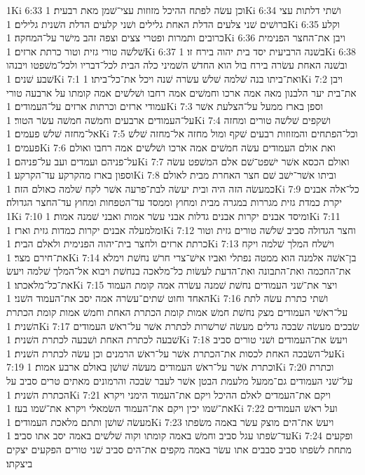 1Ki 6:33  וכן עשׂה לפתח ההיכל מזוזות עצי־שׁמן מאת רבעית׃
1Ki 6:34  ושׁתי דלתות עצי ברושׁים שׁני צלעים הדלת האחת גלילים ושׁני קלעים הדלת השׁנית גלילים׃
1Ki 6:35  וקלע כרובים ותמרות ופטרי צצים וצפה זהב מישׁר על־המחקה׃
1Ki 6:36  ויבן את־החצר הפנימית שׁלשׁה טורי גזית וטור כרתת ארזים׃
1Ki 6:37  בשׁנה הרביעית יסד בית יהוה בירח זו׃
1Ki 6:38  ובשׁנה האחת עשׂרה בירח בול הוא החדשׁ השׁמיני כלה הבית לכל־דבריו ולכל־משׁפטו ויבנהו שׁבע שׁנים׃
1Ki 7:1  ואת־ביתו בנה שׁלמה שׁלשׁ עשׂרה שׁנה ויכל את־כל־ביתו׃
1Ki 7:2  ויבן את־בית יער הלבנון מאה אמה ארכו וחמשׁים אמה רחבו ושׁלשׁים אמה קומתו על ארבעה טורי עמודי ארזים וכרתות ארזים על־העמודים׃
1Ki 7:3  וספן בארז ממעל על־הצלעת אשׁר על־העמודים ארבעים וחמשׁה חמשׁה עשׂר הטור׃
1Ki 7:4  ושׁקפים שׁלשׁה טורים ומחזה אל־מחזה שׁלשׁ פעמים׃
1Ki 7:5  וכל־הפתחים והמזוזות רבעים שׁקף ומול מחזה אל־מחזה שׁלשׁ פעמים׃
1Ki 7:6  ואת אולם העמודים עשׂה חמשׁים אמה ארכו ושׁלשׁים אמה רחבו ואולם על־פניהם ועמדים ועב על־פניהם׃
1Ki 7:7  ואולם הכסא אשׁר ישׁפט־שׁם אלם המשׁפט עשׂה וספון בארז מהקרקע עד־הקרקע׃
1Ki 7:8  וביתו אשׁר־ישׁב שׁם חצר האחרת מבית לאולם כמעשׂה הזה היה ובית יעשׂה לבת־פרעה אשׁר לקח שׁלמה כאולם הזה׃
1Ki 7:9  כל־אלה אבנים יקרת כמדת גזית מגררות במגרה מבית ומחוץ וממסד עד־הטפחות ומחוץ עד־החצר הגדולה׃
1Ki 7:10  ומיסד אבנים יקרות אבנים גדלות אבני עשׂר אמות ואבני שׁמנה אמות׃
1Ki 7:11  ומלמעלה אבנים יקרות כמדות גזית וארז׃
1Ki 7:12  וחצר הגדולה סביב שׁלשׁה טורים גזית וטור כרתת ארזים ולחצר בית־יהוה הפנימית ולאלם הבית׃
1Ki 7:13  וישׁלח המלך שׁלמה ויקח את־חירם מצר׃
1Ki 7:14  בן־אשׁה אלמנה הוא ממטה נפתלי ואביו אישׁ־צרי חרשׁ נחשׁת וימלא את־החכמה ואת־התבונה ואת־הדעת לעשׂות כל־מלאכה בנחשׁת ויבוא אל־המלך שׁלמה ויעשׂ את־כל־מלאכתו׃
1Ki 7:15  ויצר את־שׁני העמודים נחשׁת שׁמנה עשׂרה אמה קומת העמוד האחד וחוט שׁתים־עשׂרה אמה יסב את־העמוד השׁני׃
1Ki 7:16  ושׁתי כתרת עשׂה לתת על־ראשׁי העמודים מצק נחשׁת חמשׁ אמות קומת הכתרת האחת וחמשׁ אמות קומת הכתרת השׁנית׃
1Ki 7:17  שׂבכים מעשׂה שׂבכה גדלים מעשׂה שׁרשׁרות לכתרת אשׁר על־ראשׁ העמודים שׁבעה לכתרת האחת ושׁבעה לכתרת השׁנית׃
1Ki 7:18  ויעשׂ את־העמודים ושׁני טורים סביב על־השׂבכה האחת לכסות את־הכתרת אשׁר על־ראשׁ הרמנים וכן עשׂה לכתרת השׁנית׃
1Ki 7:19  וכתרת אשׁר על־ראשׁ העמודים מעשׂה שׁושׁן באולם ארבע אמות׃
1Ki 7:20  וכתרת על־שׁני העמודים גם־ממעל מלעמת הבטן אשׁר לעבר שׂבכה והרמונים מאתים טרים סביב על הכתרת השׁנית׃
1Ki 7:21  ויקם את־העמדים לאלם ההיכל ויקם את־העמוד הימני ויקרא את־שׁמו יכין ויקם את־העמוד השׂמאלי ויקרא את־שׁמו בעז׃
1Ki 7:22  ועל ראשׁ העמודים מעשׂה שׁושׁן ותתם מלאכת העמודים׃
1Ki 7:23  ויעשׂ את־הים מוצק עשׂר באמה משׂפתו עד־שׂפתו עגל סביב וחמשׁ באמה קומתו וקוה שׁלשׁים באמה יסב אתו סביב׃
1Ki 7:24  ופקעים מתחת לשׂפתו סביב סבבים אתו עשׂר באמה מקפים את־הים סביב שׁני טורים הפקעים יצקים ביצקתו׃
